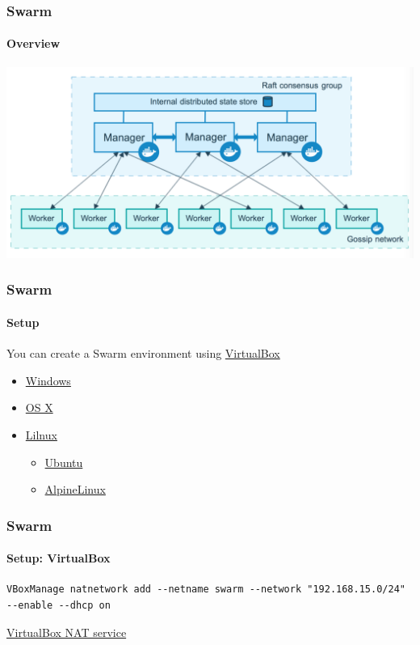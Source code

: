 \begin{frame}
\frametitle{Swarm}
\framesubtitle{Overview}
\begin{center}
\includegraphics[width=\columnwidth]{./Figure/swarm-diagram}
\end{center}
\end{frame}

\begin{frame}
\frametitle{Swarm}
\framesubtitle{Setup}
You can create a Swarm environment using \href{https://www.virtualbox.org/wiki/Downloads}{VirtualBox}
\vspace{0.4cm}
\begin{itemize}
\item \href{https://download.virtualbox.org/virtualbox/6.0.8/VirtualBox-6.0.8-130520-Win.exe}{Windows}
\item \href{https://download.virtualbox.org/virtualbox/6.0.8/VirtualBox-6.0.8-130520-OSX.dmg}{OS X}
\item \href{https://www.virtualbox.org/wiki/Linux_Downloads}{Lilnux}
  \begin{itemize}
    \item \href{https://download.virtualbox.org/virtualbox/6.0.8/virtualbox-6.0_6.0.8-130520~Ubuntu~bionic_amd64.deb}{Ubuntu}
    \item \href{http://dl-cdn.alpinelinux.org/alpine/v3.9/releases/x86_64/alpine-virt-3.9.4-x86_64.iso}{AlpineLinux}
  \end{itemize}
\end{itemize}
\end{frame}


\begin{frame}[fragile]
\frametitle{Swarm}
\framesubtitle{Setup: VirtualBox}
\begin{lstlisting}[breaklines=true]
VBoxManage natnetwork add --netname swarm --network "192.168.15.0/24" --enable --dhcp on
\end{lstlisting}
\tiny
\href{https://www.virtualbox.org/manual/ch06.html#network_nat_service}{VirtualBox NAT service}
\normalsize
\end{frame}


